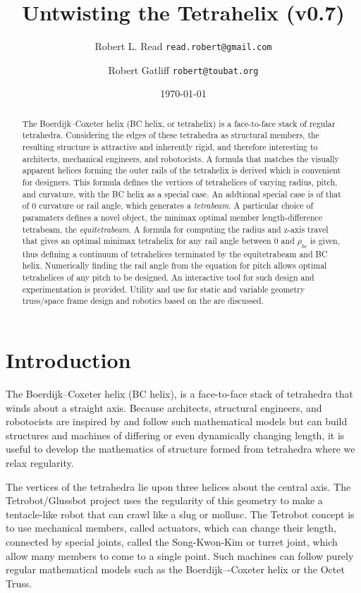 \documentclass[11pt]{article}
\title{Untwisting the Tetrahelix (v0.7)}
\author{Robert L. Read \texttt{read.robert@gmail.com} \and
  Robert Gatliff \texttt{robert@toubat.org}
}
\date{\today}
\begin{document}
\maketitle


\begin{abstract}
  The Boerdijk--Coxeter helix (BC helix, or tetrahelix) is a
  face-to-face stack of regular tetrahedra.  Considering the edges of
  these tetrahedra as structural members, the resulting structure is attractive and
  inherently rigid, and therefore interesting to architects,
  mechanical engineers, and robotocists.  A formula that matches the
  visually apparent helices forming the outer rails of the tetrahelix
  is derived which is convenient for designers.  This formula defines
  the vertices of tetrahelices of varying radius, pitch, and
  curvature, with the BC helix as a special case.  An addtional
  special case is of that of $0$ curvature or rail angle, which
  generates a \emph{tetrabeam}.  A particular choice of paramaters
  defines a novel object, the minimax optimal member length-difference
  tetrabeam, the \emph{equitetrabeam}.  A formula for computing the
  radius and z-axis travel that gives an optimal minimax tetrahelix
  for any rail angle between $0$ and $\rho_{bc}$ is given, thus
  defining a continuum of tetrahelices terminated by the equitetrabeam
  and BC helix. Numerically finding the rail angle from the equation for
  pitch allows optimal tetrahelices of any pitch to be designed.
  An interactive tool for such design and experimentation is provided.
  Utility and use for static and variable geometry
  truss/space frame design and robotics based on the are discussed.
\end{abstract}


\section{Introduction}

The Boerdijk--Coxeter helix\cite{coxeter1985simplicial} (BC helix), is
a face-to-face stack of tetrahedra that winds about a straight axis.
Because architects, structural engineers, and robotocists are inspired
by and follow such mathematical models but can build structures and
machines of differing or even dynamically changing length, it is
useful to develop the mathematics of structure formed from tetrahedra
where we relax regularity.


The vertices of the tetrahedra lie upon
three helices about the central axis.  The
Tetrobot/Glussbot\cite{TetrobotBook} project uses the regularity of
this geometry to make a tentacle-like robot that can crawl like a slug
or mollusc.  The Tetrobot concept is to use mechanical members, called
actuators, which can change their length, connected by special joints,
called the Song-Kwon-Kim\cite{song2003spherical} or turret joint,
which allow many members to come to a single point.  Such machines can
follow purely regular mathematical models such as the Boerdijk–-Coxeter
helix or the Octet Truss\cite{richard1961synergetic}.
\end{document}
